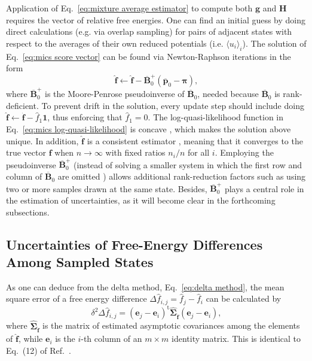 \documentclass[
    journal=jctcce,
    layout=twocolumn
]{achemso}
\newcommand{\mt}[1]{\boldsymbol{\mathbf{#1}}}   %
\newcommand{\vt}[1]{\boldsymbol{\mathbf{#1}}}   %
\newcommand{\tr}[1]{#1^\text{t}}                %
\newcommand{\avg}[1]{\overline{#1}}             %
\begin{document}
Application of Eq.~\eqref{eq:mixture average estimator} to compute both $\vt g$ and $\mt H$ requires the vector of relative free energies. One can find an initial guess by doing direct calculations (e.g. via overlap sampling\cite{Lee_1980, Lu_2003}) for pairs of adjacent states with respect to the averages of their own reduced potentials (i.e. $\langle u_i \rangle_i$). The solution of Eq.~\eqref{eq:mics score vector} can be found via Newton-Raphson iterations in the form
\begin{equation*}
\label{eq:mics Newton-Raphson}
\hat{\vt f} \leftarrow \hat{\vt f} - \avg{\mt B}_0^+ (\avg{\vt p}_0 - {\vt \pi}),
\end{equation*}
where $\avg{\mt B}_0^+ $ is the Moore-Penrose pseudoinverse of $\avg{\mt B}_0$, needed because $\avg{\mt B}_0$ is rank-deficient. To prevent drift in the solution, every update step should include doing $\hat{\vt f} \leftarrow \hat{\vt f} - \hat{f}_1 {\vt 1}$, thus enforcing that $\hat f_1 = 0$. The log-quasi-likelihood function in Eq.~\eqref{eq:mics log-quasi-likelihood} is concave \cite{Doss_2014}, which makes the solution above unique. In addition, $\hat{\vt f}$ is a consistent estimator \cite{Doss_2014}, meaning that it converges to the true vector $\vt f$ when $n \rightarrow \infty$ with fixed ratios $n_i/n$ for all $i$. Employing the pseudoinverse $\avg{\mt B}_0^+ $ (instead of solving a smaller system in which the first row and column of $\avg{\mt B}_0$ are omitted \cite{Shirts_2008}) allows additional rank-reduction factors such as using two or more samples drawn at the same state. Besides, $\avg{\mt B}_0^+ $ plays a central role in the estimation of uncertainties, as it will become clear in the forthcoming subsections.

\subsection{Uncertainties of Free-Energy Differences Among Sampled States}
\label{sec:uncertainties of free-energy differences}

As one can deduce from the delta method, Eq.~\eqref{eq:delta method}, the mean square error of a free energy difference $\Delta \hat f_{i,j} = \hat f_j - \hat f_i$ can be calculated by
\begin{equation}
\label{eq:MSE of free energy differences}
\delta^2 \Delta {\hat f}_{i,j} = \tr{({\vt e}_j - {\vt e}_i)} \hat{\mt \Sigma}_{\hat{\vt f}} ({\vt e}_j - {\vt e}_i),
\end{equation}
where $\hat{\mt \Sigma}_{\hat{\vt f}}$ is the matrix of estimated asymptotic covariances among the elements of $\hat{\vt f}$, while $\vt e_i$ is the $i$-th column of an $m \times m$ identity matrix. This is identical to Eq.~(12) of Ref.~.
\end{document}
